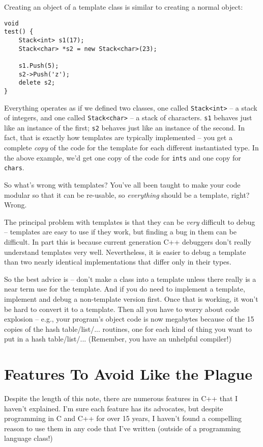 Creating an object of a template class is similar to creating
a normal object:

\begin{verbatim}
void
test() {
    Stack<int> s1(17);
    Stack<char> *s2 = new Stack<char>(23);

    s1.Push(5);
    s2->Push('z');
    delete s2;
}
\end{verbatim}

Everything operates as if we defined two classes, one
called {\tt Stack<int>} -- a stack of integers, and one
called {\tt Stack<char>} -- a stack of characters.
{\tt s1} behaves just like an instance of the first;
{\tt s2} behaves just like an instance of the second.
In fact, that is exactly how templates are typically implemented --
you get a complete {\em copy} of the code for the template
for each different instantiated type. In the above example,
we'd get one copy of the code for {\tt ints} and one copy for {\tt chars}.

So what's wrong with templates?  You've all been taught to make
your code modular so that it can be re-usable, so {\em everything}
should be a template, right?  Wrong.

The principal problem with templates is that they can be {\em very}
difficult to debug -- templates are easy to use if they work, but
finding a bug in them can be difficult. In part this is because
current generation C++ debuggers don't really understand templates
very well.  Nevertheless, it is easier to debug a template than
two nearly identical implementations that differ only in their types.

So the best advice is -- don't make a class into a template
unless there really is a near term use for the template. And if you
do need to implement a template, implement and debug a non-template
version first.  Once that is working, it won't be hard to convert
it to a template.  Then all you have to worry about code
explosion -- e.g., your program's object code is now megabytes
because of the 15 copies of the hash table/list/... routines, one for
each kind of thing you want to put in a hash table/list/...
(Remember, you have an unhelpful compiler!)

\section{Features To Avoid Like the Plague}

Despite the length of this note, there are numerous
features in C++ that I haven't explained.  I'm sure each feature
has its advocates, but despite programming in C and C++ for over 15
years, I haven't found a compelling reason to use them in any code
that I've written (outside of a programming language class!)

